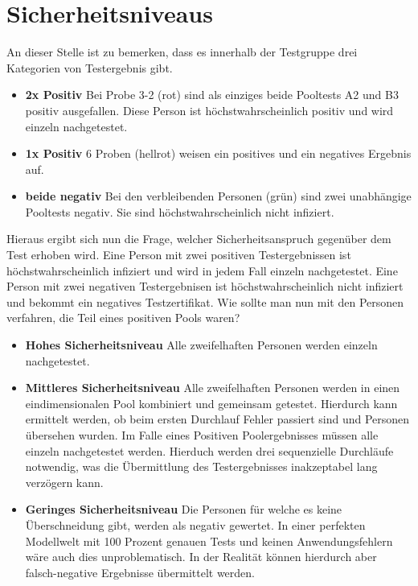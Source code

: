 \section{Sicherheitsniveaus}

An dieser Stelle ist zu bemerken, dass es innerhalb der Testgruppe drei Kategorien von Testergebnis gibt.
\begin{itemize}
	\item \textbf{2x Positiv} Bei Probe 3-2 (rot) sind als einziges beide Pooltests A2 und B3 positiv ausgefallen. Diese Person ist höchstwahrscheinlich positiv und wird einzeln nachgetestet.
	\item \textbf{1x Positiv} 6 Proben (hellrot) weisen ein positives und ein negatives Ergebnis auf.
	\item \textbf{beide negativ} Bei den verbleibenden Personen (grün) sind zwei unabhängige Pooltests negativ. Sie sind höchstwahrscheinlich nicht infiziert.
\end{itemize}
Hieraus ergibt sich nun die Frage, welcher Sicherheitsanspruch gegenüber dem Test erhoben wird.
Eine Person mit zwei positiven Testergebnissen ist höchstwahrscheinlich infiziert und wird in jedem Fall einzeln nachgetestet.
Eine Person mit zwei negativen Testergebnisen ist höchstwahrscheinlich nicht infiziert und bekommt ein negatives Testzertifikat.
Wie sollte man nun mit den Personen verfahren, die Teil eines positiven Pools waren?

\begin{itemize}
	\item \textbf{Hohes Sicherheitsniveau} Alle zweifelhaften Personen werden einzeln nachgetestet.
	\item \textbf{Mittleres Sicherheitsniveau} Alle zweifelhaften Personen werden in einen eindimensionalen Pool kombiniert und gemeinsam getestet. Hierdurch kann ermittelt werden, ob beim ersten Durchlauf Fehler passiert sind und Personen übersehen wurden. Im Falle eines Positiven Poolergebnisses müssen alle einzeln nachgetestet werden. Hierduch werden drei sequenzielle Durchläufe notwendig, was die Übermittlung des Testergebnisses inakzeptabel lang verzögern kann.
	\item \textbf{Geringes Sicherheitsniveau} Die Personen für welche es keine Überschneidung gibt, werden als negativ gewertet. In einer perfekten Modellwelt mit 100 Prozent genauen Tests und keinen Anwendungsfehlern wäre auch dies unproblematisch. In der Realität können hierdurch aber falsch-negative Ergebnisse übermittelt werden.
\end{itemize}

